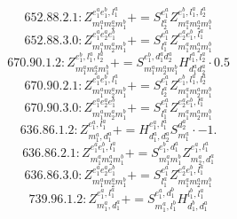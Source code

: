 \documentclass[letterpaper,10pt,fleqn,leqno,onecolumn]{article}
\begin{document}
\begin{equation} \;\;\;\;\;\;  652.88.2.1: Z^{e_{1}^{a}e_{1}^{b},l_{1}^{a}}_{m_{1}^{a}m_{2}^{a}m_{1}^{b}}+=S^{e_{1}^{a}}_{l_{2}^{a}}Z^{e_{1}^{b},l_{1}^{a},l_{2}^{a}}_{m_{1}^{a}m_{2}^{a}m_{1}^{b}} \end{equation}
\begin{equation} \;\;\;\;\;\;  652.88.3.0: Z^{e_{1}^{a}e_{2}^{a}e_{1}^{b}}_{m_{1}^{a}m_{2}^{a}m_{1}^{b}}+=S^{e_{1}^{a}}_{l_{1}^{a}}Z^{e_{2}^{a}e_{1}^{b},l_{1}^{a}}_{m_{1}^{a}m_{2}^{a}m_{1}^{b}} \end{equation}
\begin{equation} \;\;\;\;\;\;  670.90.1.2: Z^{e_{1}^{b},l_{1}^{a},l_{2}^{a}}_{m_{1}^{a}m_{2}^{a}m_{1}^{b}}+=S^{e_{1}^{b},d_{1}^{a}d_{2}^{a}}_{m_{1}^{a}m_{2}^{a}m_{1}^{b}}H^{l_{1}^{a},l_{2}^{a}}_{d_{1}^{a}d_{2}^{a}}\cdot 0.5 \end{equation}
\begin{equation} \;\;\;\;\;\;  670.90.2.1: Z^{e_{1}^{a}e_{1}^{b},l_{1}^{a}}_{m_{1}^{a}m_{2}^{a}m_{1}^{b}}+=S^{e_{1}^{a}}_{l_{2}^{a}}Z^{e_{1}^{b},l_{1}^{a},l_{2}^{a}}_{m_{1}^{a}m_{2}^{a}m_{1}^{b}} \end{equation}
\begin{equation} \;\;\;\;\;\;  670.90.3.0: Z^{e_{1}^{a}e_{2}^{a}e_{1}^{b}}_{m_{1}^{a}m_{2}^{a}m_{1}^{b}}+=S^{e_{1}^{a}}_{l_{1}^{a}}Z^{e_{2}^{a}e_{1}^{b},l_{1}^{a}}_{m_{1}^{a}m_{2}^{a}m_{1}^{b}} \end{equation}
\begin{equation} \;\;\;\;\;\;  636.86.1.2: Z^{e_{1}^{a},l_{1}^{a}}_{m_{1}^{a},d_{1}^{a}}+=H^{e_{1}^{a},l_{1}^{a}}_{d_{1}^{a},d_{2}^{a}}S^{d_{2}^{a}}_{m_{1}^{a}}\cdot -1. \end{equation}
\begin{equation} \;\;\;\;\;\;  636.86.2.1: Z^{e_{1}^{a}e_{1}^{b},l_{1}^{a}}_{m_{1}^{a}m_{2}^{a}m_{1}^{b}}+=S^{e_{1}^{b},d_{1}^{a}}_{m_{1}^{a}m_{1}^{b}}Z^{e_{1}^{a},l_{1}^{a}}_{m_{2}^{a},d_{1}^{a}} \end{equation}
\begin{equation} \;\;\;\;\;\;  636.86.3.0: Z^{e_{1}^{a}e_{2}^{a}e_{1}^{b}}_{m_{1}^{a}m_{2}^{a}m_{1}^{b}}+=S^{e_{1}^{a}}_{l_{1}^{a}}Z^{e_{2}^{a}e_{1}^{b},l_{1}^{a}}_{m_{1}^{a}m_{2}^{a}m_{1}^{b}} \end{equation}
\begin{equation} \;\;\;\;\;\;  739.96.1.2: Z^{e_{1}^{a},l_{1}^{a}}_{m_{1}^{a},d_{1}^{a}}+=S^{e_{1}^{a},d_{1}^{b}}_{m_{1}^{a},l_{1}^{b}}H^{l_{1}^{b},l_{1}^{a}}_{d_{1}^{b},d_{1}^{a}} \end{equation}
\end{document}
